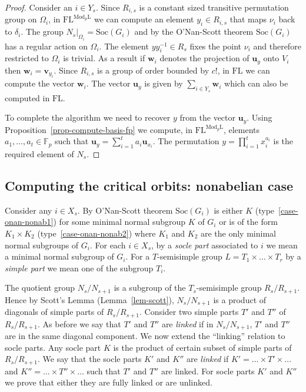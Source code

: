 \documentclass[11pt]{madras}%
\theoremstyle{remark}
\newcommand{\ModkL}[1]{{\ensuremath{\mathrm{Mod}_{#1}\mathrm{L}}}}
\newcommand{\pr}[2]{{\ensuremath{\left.{#1}\right\vert_{#2}}}}
\newcommand{\Soc}[1]{{\ensuremath{\mathrm{Soc}\left(#1\right)}}}
\begin{document}
\begin{proof}

  Consider an $i \in Y_s$.  Since $R_{i,s}$ is a constant sized
  transitive permutation group on $\Omega_i$, in
  $\mathrm{FL}^{\ModkL{p}}$ we can compute an element $y_i \in
  R_{i,s}$ that maps $\nu_i$ back to $\delta_i$.  The group
  $\pr{N_s}{\Omega_i} = \Soc{G_i}$ and by the O'Nan-Scott theorem
  $\Soc{G_i}$ has a regular action on $\Omega_i$.  The element
  $yy_i^{-1} \in R_s$ fixes the point $\nu_i$ and therefore restricted
  to $\Omega_i$ is trivial. As a result if $\mathbf{w}_i$ denotes the
  projection of $\mathbf{u}_y$ onto $V_i$ then $\mathbf{w}_i =
  \mathbf{v}_{y_i}$. Since $R_{i,s}$ is a group of order bounded by
  $c!$, in $\mathrm{FL}$ we can compute the vector $\mathbf{w}_i$. The
  vector $\mathbf{u}_y$ is given by $\sum_{i \in Y_s} \mathbf{w}_i$
  which can also be computed in $\mathrm{FL}$.

  To complete the algorithm we need to recover $y$ from the vector
  $\mathbf{u}_y$.  Using Proposition~\ref{prop-compute-basis-fp} we
  compute, in $\mathrm{FL}^{\ModkL{p}}$, elements $a_1, \ldots, a_t
  \in \mathbb{F}_p$ such that $\mathbf{u}_y = \sum_{i=1}^t a_i
  \mathbf{u}_{x_i}$. The permutation $y = \prod_{i=1}^t x_i^{a_i}$ is
  the required element of $N_s$.
\end{proof}

\subsection{Computing the critical orbits: nonabelian case}\label{subsect-nonab-critical}

Consider any $i \in X_s$. By O'Nan-Scott theorem $\Soc{G_i}$ is either
$K$ (type~\ref{case-onan-nonab1}) for some minimal normal subgroup $K$
of $G_i$ or is of the form $K_1 \times K_2$
(type~\ref{case-onan-nonab2}) where $K_1$ and $K_2$ are the only
minimal normal subgroups of $G_i$.  For each $i \in X_s$, by a
\emph{socle part} associated to $i$ we mean a minimal normal subgroup
of $G_i$. For a $T$-semisimple group $L = T_1 \times \ldots \times
T_r$ by a \emph{simple part} we mean one of the subgroup $T_i$.

The quotient group $N_s/N_{s+1}$ is a subgroup of the $T_s$-semisimple
group $R_s/R_{s+1}$. Hence by Scott's Lemma (Lemma~\ref{lem-scott}),
$N_s/N_{s+1}$ is a product of diagonals of simple parts of
$R_s/R_{s+1}$.  Consider two simple parts $T'$ and $T''$ of
$R_s/R_{s+1}$. As before we say that $T'$ and $T''$ are \emph{linked}
if in $N_s/N_{s+1}$, $T'$ and $T''$ are in the same diagonal
component.  We now extend the ``linking'' relation to socle parts.
Any socle part $K$ is the product of certain subset of simple parts of
$R_s/R_{s+1}$. We say that the socle parts $K'$ and $K''$ are
\emph{linked} if $K' = \ldots \times T'\times \ldots$ and $K'' =
\ldots \times T'' \times \ldots$ such that $T'$ and $T''$ are linked.
For socle parts $K'$ and $K''$ we prove that either they are fully
linked or are unlinked.
\end{document}
